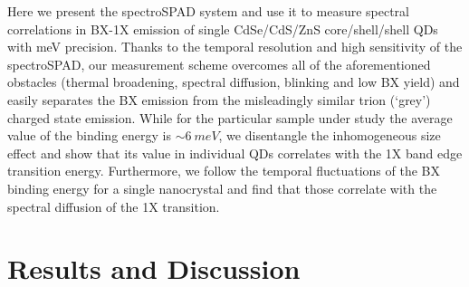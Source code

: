 \documentclass[journal=nalefd, manuscript=letter, layout=twocolumn]{achemso}
\begin{document}
Here we present the spectroSPAD system and use it to measure spectral correlations in BX-1X emission of single CdSe/CdS/ZnS core/shell/shell QDs with meV precision. Thanks to the temporal resolution and high sensitivity of the spectroSPAD, our measurement scheme overcomes all of the aforementioned obstacles (thermal broadening, spectral diffusion, blinking and low BX yield) and easily separates the BX emission from the misleadingly similar trion (`grey') charged state emission. While for the particular sample under study the average value of the binding energy is ${\sim}\SI{6}{meV}$, we disentangle the inhomogeneous size effect and show that its value in individual QDs correlates with the 1X band edge transition energy. Furthermore, we follow the temporal fluctuations of the BX binding energy for a single nanocrystal and find that those correlate with the spectral diffusion of the 1X transition.

\section*{Results and Discussion}
\end{document}
